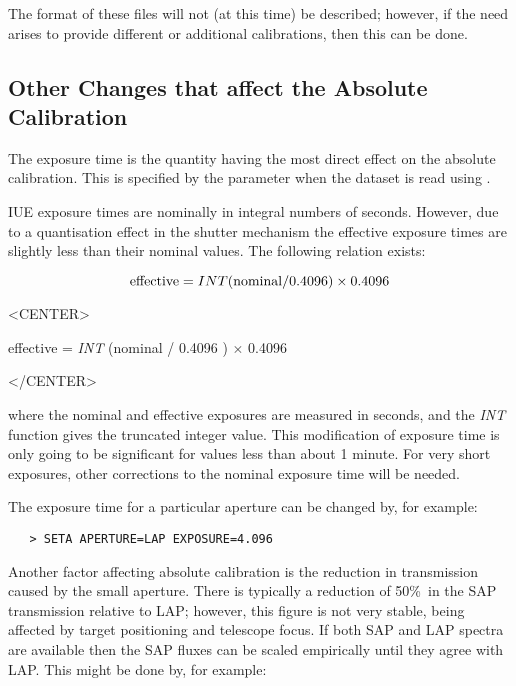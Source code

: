 The format of these files will not (at this time) be described; however, if the
need arises to provide different or additional calibrations, then this can be
done.


\subsection{Other Changes that affect the Absolute Calibration}

The exposure time is the quantity having the most direct effect on the
absolute calibration.  This is specified by the
 parameter
when the dataset is read using \@.

IUE exposure times are nominally in integral numbers of seconds.  However,
due to a quantisation effect in the shutter mechanism the effective exposure
times are slightly less than their nominal values.  The following relation
exists:

\begin{latexonly}
\begin{displaymath}
    {\rm effective} = INT({\rm nominal} / 0.4096) \times 0.4096
\end{displaymath}
\end{latexonly}

\begin{htmlonly}
\begin{rawhtml}
<CENTER>
\end{rawhtml}
effective = {\it INT} (nominal / 0.4096 ) $\times$ 0.4096
\begin{rawhtml}
</CENTER>
\end{rawhtml}
\end{htmlonly}

where the nominal and effective exposures are measured in seconds, and
the {\it INT} function gives the truncated integer value.  This modification
of exposure time is only going to be significant for values less than about 1
minute.  For very short exposures, other corrections to the nominal exposure
time will be needed.

The exposure time for a particular aperture can be changed by, for example:

\begin{verbatim}
   > SETA APERTURE=LAP EXPOSURE=4.096
\end{verbatim}

Another factor affecting absolute calibration is the reduction in
transmission caused by the small aperture.  There is typically a
reduction of 50\%\ in the SAP transmission relative to LAP; however,
this figure is not very stable, being affected by target positioning and
telescope focus.  If both SAP and LAP spectra are available then the SAP
fluxes can be scaled empirically until they agree with LAP\@.  This might be
done by, for example:

